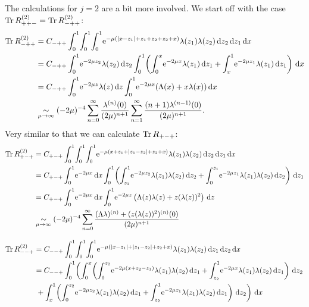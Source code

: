 The calculations for $j = 2$ are a bit more involved. We start off with the case
$\operatorname{Tr} R^{(2)}_{++-} =  \operatorname{Tr} R^{(2)}_{-++}$:
\begin{align*}
  \Tr R^{(2)}_{-++} &= C_{-++} \Int{x}{
  \Int{z_1}{
    \Int{z_2}{
      \Eto{-\mu(\Abs{x-z_1} + z_1 + z_2 + z_2 + x)}
      \lambda(z_1)\lambda(z_2)
    }
  }
  } \\
  &= C_{-++} \Int{z_2}{\Eto{-2\mu z_2}\lambda(z_2)}
  \Int{x}{
    \left(
    \Integ[x]{0}{z_1}{
      \Eto{-2\mu x}\lambda(z_1)
    }
    + \Integ[1]{x}{z_1}{
      \Eto{-2\mu z_1}\lambda(z_1)
    }
    \right)
  } \\
  &= C_{-++} \Int{z}{\Eto{-2\mu z}\lambda(z)}
  \Int{x}{\Eto{-2\mu x}(\Lambda(x) + x\lambda(x))} \\
  &\SimMu (-2\mu)^{-4} \Wsum{\lambda^{(n)}} \Wsum[1]{(n+1)\lambda^{(n-1)}}.
\end{align*}
Very similar to that we can calculate $\operatorname{Tr} R_{+-+}$:
\begin{align*}
  \Tr R_{+-+}^{(2)} &= C_{+-+} \Int{x}{
    \Int{z_1}{
      \Int{z_2}{
        \Eto{-\mu(x+z_1 + \Abs{z_1 - z_2} + z_2 + x)}
        \lambda(z_1)\lambda(z_2)
      }
    }
  } \\
  &= C_{+-+} \Int{x}{\Eto{-2\mu x}}
  \Int{z_1}{
    \left(
    \Integ[1]{z_1}{z_2}{
      \Eto{-2\mu z_2}\lambda(z_1)\lambda(z_2)
    }
    + \Integ[z_1]{0}{z_2}{
      \Eto{-2\mu z_1}\lambda(z_1)\lambda(z_2)
    }
    \right)
  } \\
  &= C_{+-+} \Int{x}{\Eto{-2\mu x}}
    \Int{z}{
      \Eto{-2\mu z}\left(
        \Lambda(z)\lambda(z) + z (\lambda(z))^2
      \right)
    } \\
    &\SimMu (-2\mu)^{-4} \sum_{n=0}^\infty \frac{(\Lambda\lambda)^{(n)} +
  (z(\lambda(z))^2)^{(n)}(0)}{(2\mu)^{n+1}}
\end{align*}

\begin{align*}
  \Tr R_{--+}^{(2)} &= C_{--+} \Int{x}{
    \Int{z_2}{
      \Int{z_1}{
        \Eto{-\mu(\Abs{x-z_1} + \Abs{z_1 - z_2} + z_2 + x)}
        \lambda(z_1)\lambda(z_2)
      }
    }
  } \\
  &= C_{--+} \Int{x}{
    \left(
      \Integ[x]{0}{z_2}{
        \left(
          \Integ[z_2]{0}{z_1}{
            \Eto{-2\mu(x + z_2 - z_1)}\lambda(z_1)\lambda(z_2)
          } + \Integ[1]{z_2}{z_1}{
            \Eto{-2\mu x}\lambda(z_1)\lambda(z_2)
          }
        \right)
      }\right. \\
      &\left.{} + \Integ[1]{x}{z_2}{
        \left(
          \Integ[z_2]{0}{z_1}{
            \Eto{-2\mu z_2}\lambda(z_1)\lambda(z_2)
          }
          + \Integ[1]{z_2}{z_1}{
            \Eto{-2\mu z_1}\lambda(z_1)\lambda(z_2)
          }
        \right)
      }
    \right)
  }
\end{align*}
% 

